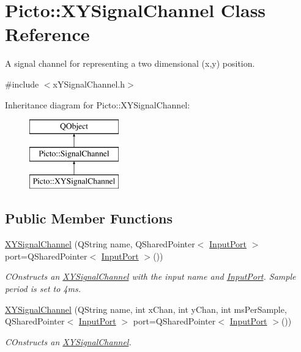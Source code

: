 \hypertarget{class_picto_1_1_x_y_signal_channel}{\section{Picto\-:\-:X\-Y\-Signal\-Channel Class Reference}
\label{class_picto_1_1_x_y_signal_channel}
}


A signal channel for representing a two dimensional (x,y) position.  




{\ttfamily \#include $<$x\-Y\-Signal\-Channel.\-h$>$}

Inheritance diagram for Picto\-:\-:X\-Y\-Signal\-Channel\-:\begin{figure}[H]
\begin{center}
\leavevmode
\includegraphics[height=3.000000cm]{class_picto_1_1_x_y_signal_channel}
\end{center}
\end{figure}
\subsection*{Public Member Functions}
\begin{DoxyCompactItemize}
\item 
\hypertarget{class_picto_1_1_x_y_signal_channel_a00f66459c804d57e7591647e0f90f64d}{\hyperlink{class_picto_1_1_x_y_signal_channel_a00f66459c804d57e7591647e0f90f64d}{X\-Y\-Signal\-Channel} (Q\-String name, Q\-Shared\-Pointer$<$ \hyperlink{class_picto_1_1_input_port}{Input\-Port} $>$ port=Q\-Shared\-Pointer$<$ \hyperlink{class_picto_1_1_input_port}{Input\-Port} $>$())}\label{class_picto_1_1_x_y_signal_channel_a00f66459c804d57e7591647e0f90f64d}

\begin{DoxyCompactList}\small\item\em C\-Onstructs an \hyperlink{class_picto_1_1_x_y_signal_channel}{X\-Y\-Signal\-Channel} with the input name and \hyperlink{class_picto_1_1_input_port}{Input\-Port}. Sample period is set to 4ms. \end{DoxyCompactList}\item 
\hyperlink{class_picto_1_1_x_y_signal_channel_a5dc63f0b9a70ddf7b13a9df184c71e0f}{X\-Y\-Signal\-Channel} (Q\-String name, int x\-Chan, int y\-Chan, int ms\-Per\-Sample, Q\-Shared\-Pointer$<$ \hyperlink{class_picto_1_1_input_port}{Input\-Port} $>$ port=Q\-Shared\-Pointer$<$ \hyperlink{class_picto_1_1_input_port}{Input\-Port} $>$())
\begin{DoxyCompactList}\small\item\em C\-Onstructs an \hyperlink{class_picto_1_1_x_y_signal_channel}{X\-Y\-Signal\-Channel}. \end{DoxyCompactList}\end{DoxyCompactItemize}
